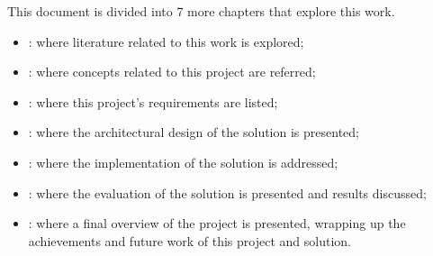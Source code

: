 This document is divided into 7 more chapters that explore this work.

\begin{itemize}
    \item {}: where literature related to this work is explored;
    \item {}: where concepts related to this project are referred;
    \item {}: where this project's requirements are listed;
    \item {}: where the architectural design of the solution is presented;
    \item {}: where the implementation of the solution is addressed;
    \item {}: where the evaluation of the solution is presented and results discussed;
    \item {}: where a final overview of the project is presented, wrapping up the achievements and future work of this project and solution.
\end{itemize}
